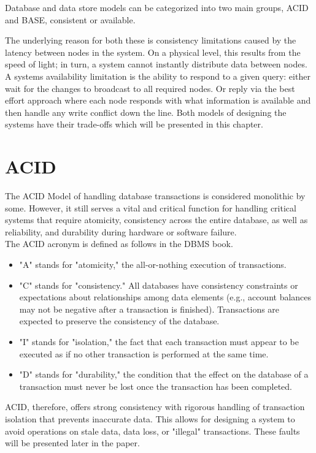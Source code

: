 \documentclass[a4paper,10pt,titlepage]{report}
\begin{document}
    Database and data store models can be categorized into two main groups, ACID and BASE, consistent or available.

    The underlying reason for both these is consistency limitations caused by the latency between nodes in the system. On a physical level, this results from the speed of light; in turn, a system cannot instantly distribute data between nodes. A systems availability limitation is the ability to respond to a given query: either wait for the changes to broadcast to all required nodes. Or reply via the best effort approach where each node responds with what information is available and then handle any write conflict down the line. Both models of designing the systems have their trade-offs which will be presented in this chapter.


    \section{ACID}
    The ACID Model of handling database transactions is considered monolithic by some. However, it still serves a vital and critical function for handling critical systems that require atomicity, consistency across the entire database, as well as reliability, and durability during hardware or software failure.\\
    \vspace{5mm}
    The ACID acronym is defined as follows in the DBMS book\cite{DBMSbook}.

    \begin{itemize}
        \item "A" stands for "atomicity," the all-or-nothing execution of transactions.
        \item "C" stands for "consistency." All databases have consistency constraints or expectations about relationships among data elements (e.g., account balances may not be negative after a transaction is finished). Transactions are expected to preserve the consistency of the database.
        \item "I" stands for "isolation," the fact that each transaction must appear to be executed as if no other transaction is performed at the same time.
        \item "D" stands for "durability," the condition that the effect on the database of a transaction must never be lost once the transaction has been completed.
    \end{itemize}

    ACID, therefore, offers strong consistency with rigorous handling of transaction isolation that prevents inaccurate data. This allows for designing a system to avoid operations on stale data, data loss, or "illegal" transactions. These faults will be presented later in the paper.
\end{document}
